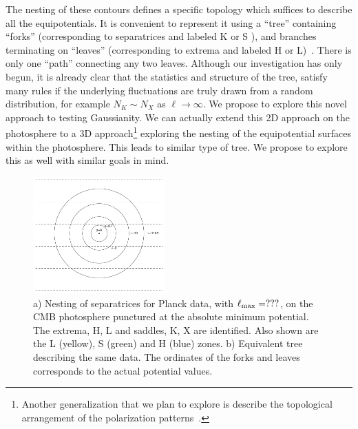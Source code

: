 \documentclass[psfig,11pt]{article}
\begin{document}
{The nesting of these contours defines a specific topology which suffices to describe all the equipotentials. It is convenient to represent it using a ``tree'' containing ``forks'' (corresponding to separatrices and labeled K or S ), and branches terminating on ``leaves'' (corresponding to extrema and labeled H or L)~\cite{west2001introduction}. There is only one ``path'' connecting any two leaves. Although our investigation has only begun, it is already clear that the statistics and structure of the tree, satisfy many rules if the underlying fluctuations are truly drawn from a random distribution, for example $N_K\sim N_X$ as $\ell\rightarrow\infty$. We propose to explore this novel approach to testing Gaussianity. We can actually extend this 2D approach on the photosphere to a 3D approach\footnote{Another generalization that we plan to explore is describe the topological arrangement of the polarization patterns~\cite{Scheuer:1977}.} exploring the nesting of the equipotential surfaces within the photosphere. This leads to similar type of tree. We propose to explore this as well with similar goals in mind.
\begin{figure}[t]
\centering
\includegraphics[width=2in]{figures/nsffig.pdf}
\caption{{\small a) Nesting of separatrices for Planck data, with $\ell_{\rm max}=???$, on the CMB photosphere punctured at the absolute minimum potential. The extrema, H, L and saddles, K, X are identified. Also shown are the L (yellow), S (green) and H (blue) zones. b) Equivalent tree describing the same data. The ordinates of the forks and leaves corresponds to the actual potential values.}}
\end{figure}



}
\end{document}
